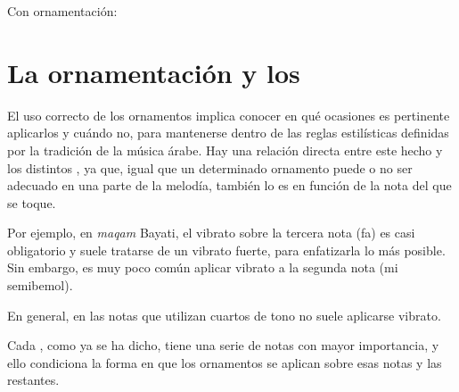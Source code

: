 Con ornamentación:


\begin{center}
\end{center}




\section{La ornamentación y los \maqamaat}

  El uso correcto de los ornamentos implica conocer en qué ocasiones es pertinente aplicarlos y cuándo no, para mantenerse dentro de las reglas estilísticas definidas por la tradición de la música árabe. Hay una relación directa entre este hecho y los distintos \maqamaatb, ya que, igual que un determinado ornamento puede o no ser adecuado en una parte de la melodía, también lo es en función de la nota del \maqam que se toque.

  Por ejemplo, en \emph{maqam} Bayati, el vibrato sobre la tercera nota (fa) es casi obligatorio y suele tratarse de un vibrato fuerte, para enfatizarla lo más posible. Sin embargo, es muy poco común aplicar vibrato a la segunda nota (mi semibemol).

  En general, en las notas que utilizan cuartos de tono no suele aplicarse vibrato.

  Cada \maqamb, como ya se ha dicho, tiene una serie de notas con mayor importancia, y ello condiciona la forma en que los ornamentos se aplican sobre esas notas y las restantes.

\thispagestyle{empty}